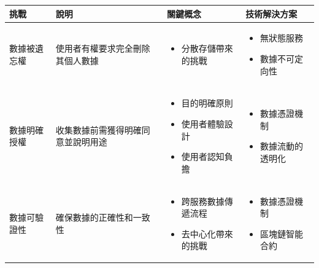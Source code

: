 \begin{table}
  \centering
  \begin{tabular}{>{\raggedright\arraybackslash}p{3cm}>{\raggedright\arraybackslash}p{2.5cm}>{\raggedright\arraybackslash}p{4cm}>{\raggedright\arraybackslash}p{3.5cm}}
    \toprule
    \textbf{挑戰}                         & \textbf{說明}       & \textbf{關鍵概念} & \textbf{技術解決方案} \\
    \midrule
    數據被遺忘權                              & 使用者有權要求完全刪除其個人數據  &
    \begin{itemize}[nosep,leftmargin=*]
      \item 分散存儲帶來的挑戰
    \end{itemize} &
    \begin{itemize}[nosep,leftmargin=*]
      \item 無狀態服務
      \item 數據不可定向性
    \end{itemize}                                                        \\
    \addlinespace
    數據明確授權                              & 收集數據前需獲得明確同意並說明用途 &
    \begin{itemize}[nosep,leftmargin=*]
      \item 目的明確原則
      \item 使用者體驗設計
      \item 使用者認知負擔
    \end{itemize} &
    \begin{itemize}[nosep,leftmargin=*]
      \item 數據憑證機制
      \item 數據流動的透明化
    \end{itemize}                                                        \\
    \addlinespace
    數據可驗證性                              & 確保數據的正確性和一致性      &
    \begin{itemize}[nosep,leftmargin=*]
      \item 跨服務數據傳遞流程
      \item 去中心化帶來的挑戰
    \end{itemize} &
    \begin{itemize}[nosep,leftmargin=*]
      \item 數據憑證機制
      \item 區塊鏈智能合約
    \end{itemize}                                                        \\

\end{tabular}
\end{table}
